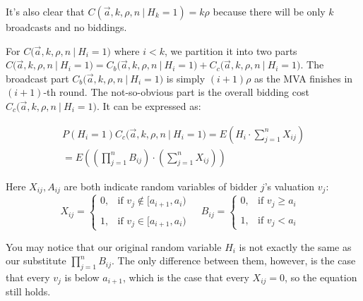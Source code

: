 It's also clear that $C(\vec a, k, \rho, n ~\big|~ H_k = 1) = k\rho$ because
there will be only $k$ broadcasts and no biddings.

For $C\big(\vec a, k, \rho, n ~\big|~ H_i = 1\big)$ where $i < k$, we partition
it into two parts $C\big(\vec a, k, \rho, n ~\big|~ H_i = 1\big) = C_b\big(\vec
a, k, \rho, n ~\big|~ H_i = 1\big) + C_c\big(\vec a, k, \rho, n ~\big|~ H_i =
1\big)$. The broadcast part $C_b\big(\vec a, k, \rho, n ~\big|~ H_i = 1 \big)$
is simply $(i+1)\rho$ as the MVA finishes in $(i+1)$-th round. The
not-so-obvious part is the overall bidding cost $C_c\big(\vec a, k, \rho, n
~\big|~ H_i = 1 \big)$. It can be expressed as:

\begin{align*}
P(H_i = 1)C_c\big(\vec a, k, \rho, n ~\big|~ H_i = 1 \big) = E\left( H_i \cdot
    \sum_{j=1}^n X_{ij}\right) \\
= E\left( \left( \prod_{j=1}^n B_{ij} \right) \cdot \left(\sum_{j=1}^n X_{ij}
    \right) \right)
\end{align*}

Here $X_{ij}, A_{ij}$ are both indicate random variables of bidder $j$'s valuation $v_j$:
$$
X_{ij} = \begin{cases}
    0, &\mbox{if $v_j \notin [a_{i+1}, a_{i})$ } \\\\
    1, &\mbox{if $v_j \in [a_{i+1}, a_{i})$}
\end{cases}
~~
B_{ij} = \begin{cases}
    0, &\mbox{if $v_j \geq a_{i}$ } \\\\
    1, &\mbox{if $v_j < a_{i}$}
\end{cases}
$$

You may notice that our original random variable $H_i$ is not exactly the same
as our substitute $\prod_{j=1}^n B_{ij}$. The only difference between them,
however, is the case that every $v_j$ is below $a_{i+1}$, which is the case
that every $X_{ij} = 0$, so the equation still holds.

